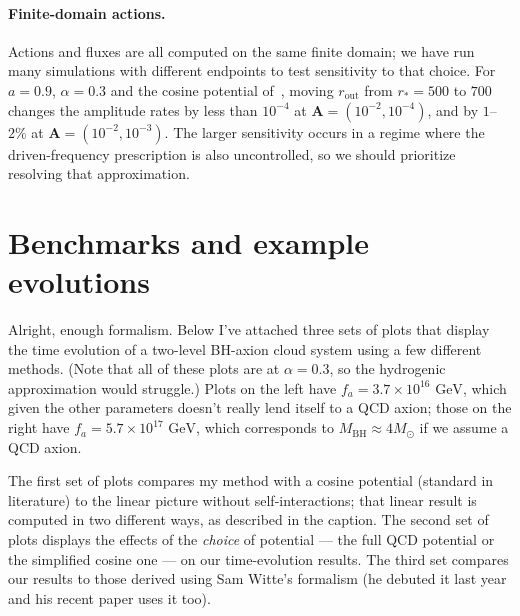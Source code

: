 \documentclass[11pt]{article}
\begin{document}
\paragraph{Finite-domain actions.} Actions and fluxes are all computed on the same finite domain; we have run many simulations with different endpoints to test sensitivity to that choice. For $a=0.9$, $\alpha=0.3$ and the cosine potential of~\cite{Omiya_2022,Omiya_2023}, moving $r_\mathrm{out}$ from $r_*=500$ to $700$ changes the amplitude rates by less than $10^{-4}$ at $\mathbf A=(10^{-2},10^{-4})$, and by $1$--$2\%$ at $\mathbf A = (10^{-2},10^{-3})$. The larger sensitivity occurs in a regime where the driven-frequency prescription is also uncontrolled, so we should prioritize resolving that approximation.

\section{Benchmarks and example evolutions}
Alright, enough formalism. Below I've attached three sets of plots that display the time evolution of a two-level BH-axion cloud system using a few different methods. (Note that all of these plots are at $\alpha = 0.3$, so the hydrogenic approximation would struggle.) Plots on the left have $f_a = 3.7 \times 10^{16} \text{ GeV}$, which given the other parameters doesn't really lend itself to a QCD axion; those on the right have $f_a = 5.7 \times 10^{17} \text{ GeV}$, which corresponds to $M_\text{BH} \approx 4 M_\odot$ if we assume a QCD axion. 

The first set of plots compares my method with a cosine potential (standard in literature) to the linear picture without self-interactions; that linear result is computed in two different ways, as described in the caption. The second set of plots displays the effects of the \textit{choice} of potential --- the full QCD potential or the simplified cosine one --- on our time-evolution results. The third set compares our results to those derived using Sam Witte's formalism (he debuted it last year and his recent paper uses it too).
\end{document}
